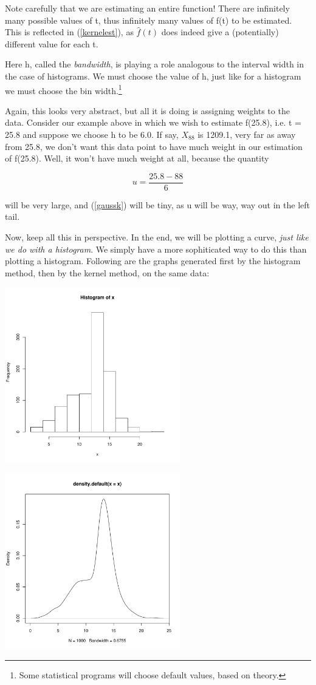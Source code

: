 Note carefully that we are estimating an entire function!  There are
infinitely many possible values of t, thus infinitely many values of
f(t) to be estimated.  This is reflected in (\ref{kernelest}), as
$\widehat{f}(t)$ does indeed give a (potentially) different value for
each t.

Here h, called the {\it bandwidth}, is playing a role analogous to the
interval width in the case of histograms.  We must choose the value of
h, just like for a histogram we must choose the bin width.\footnote{Some
statistical programs will choose default values, based on theory.}

Again, this looks very abstract, but all it is doing is assigning
weights to the data.  Consider our example above in which we wish to
estimate f(25.8), i.e. t = 25.8 and suppose we choose h to be 6.0.  If
say, $X_{88}$ is 1209.1, very far as away from 25.8, we don't want this
data point to have much weight in our estimation of f(25.8).  Well, it
won't have much weight at all, because the quantity

\begin{equation}
u = \frac{25.8-88}{6}
\end{equation}

will be very large, and (\ref{gaussk}) will be tiny, as u will be way,
way out in the left tail.

Now, keep all this in perspective.  In the end, we will be plotting a
curve, {\it just like we do with a histogram}.  We simply have a more
sophiticated way to do this than plotting a histogram.  Following are
the graphs generated first by the histogram method, then by the kernel
method, on the same data:

\includegraphics[width=3.0in]{Images/Hist.pdf}

\includegraphics[width=3.0in]{Images/Kern.pdf}

